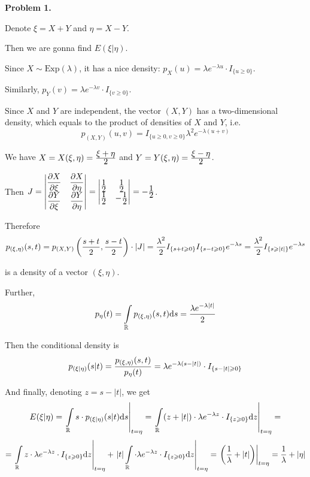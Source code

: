 \documentclass[pdftex,12pt,a4paper]{article}
\begin{document}
\textbf{Problem 1.}\par
Denote $\xi = X + Y$ and $\eta = X - Y$.\par
Then we are gonna find  $E(\xi| \eta)$.\par
Since $X \sim \mathrm{Exp}(\lambda)$, it has a nice density: $p_{X}(u) = \lambda e^{-\lambda u}\cdot I_{\{u \geqslant 0\}}$.\par
Similarly, $p_{Y}(v) =  \lambda e^{-\lambda v}\cdot I_{\{v \geqslant 0\}}$.\par
Since $X$ and $Y$ are independent, the vector $(X,Y)$ has a two-dimensional density, which equals to the product of densities of $X$ and $Y$, i.e.
$$
p_{(X,Y)}(u,v) = I_{\{u\geqslant 0, v\geqslant 0\}}\lambda^{2}e^{-\lambda(u+v)}
$$\par
We have $X = X(\xi, \eta) = \frac{\displaystyle \xi + \eta}{\displaystyle 2}$ and $Y = Y(\xi, \eta) = \frac{\displaystyle \xi - \eta}{\displaystyle 2}$.\par
Then $J = \begin{vmatrix}\dfrac{\displaystyle \partial X}{\displaystyle \partial \xi} & \dfrac{\displaystyle \partial X}{\displaystyle \partial \eta}\\ \dfrac{\displaystyle \partial Y}{\displaystyle \partial \xi}& \dfrac{\displaystyle \partial Y}{\displaystyle \partial \eta}
\end{vmatrix} = \begin{vmatrix}\frac{\displaystyle 1}{\displaystyle 2} & \frac{\displaystyle 1}{\displaystyle 2}\\ \frac{\displaystyle 1}{\displaystyle 2}& -\frac{\displaystyle 1}{\displaystyle 2}
\end{vmatrix} = - \frac{\displaystyle 1}{\displaystyle 2}$.\par
Therefore
$$
p_{(\xi, \eta)}(s,t) = p_{(X,Y)}\left(\frac{\displaystyle s+t}{\displaystyle 2}, \frac{\displaystyle s-t}{\displaystyle 2}\right)\cdot |J| = \frac{\displaystyle \lambda^{2}}{\displaystyle 2}I_{\{ s + t \geqslant 0\}}I_{\{s - t \geqslant 0\}}e^{-\lambda s} = \frac{\displaystyle \lambda^{2}}{\displaystyle 2}I_{\{ s \geqslant |t|\}}e^{-\lambda s}
$$
\par
is a density of a vector $(\xi, \eta)$.\par
Further, 
$$
p_{\eta}(t) = \int\limits_{\mathbb R}p_{(\xi, \eta)}(s,t)\mathrm{d}s = \frac{\displaystyle \lambda e^{-\lambda|t|}}{\displaystyle 2}
$$\par
Then the conditional density is
$$
p_{(\xi | \eta)}(s|t) = \frac{\displaystyle p_{(\xi, \eta)}(s,t)}{\displaystyle p_{\eta}(t)} = \lambda e^{-\lambda(s-|t|)}\cdot I_{\{s - |t|\geqslant 0\}}
$$\par
And finally, denoting $z = s - |t|$, we get
$$
E(\xi|\eta) = \left.\int\limits_{\mathbb R}s\cdot p_{(\xi|\eta)}(s|t)\mathrm{d}s\right|_{t = \eta} = \left.\int\limits_{\mathbb R}(z + |t|)\cdot\lambda e^{-\lambda z}\cdot I_{\{z\geqslant 0\}}\mathrm{d}z\right|_{t = \eta}  = $$  $$= \left.\int\limits_{\mathbb R}z\cdot\lambda e^{-\lambda z}\cdot I_{\{z\geqslant 0\}}\mathrm{d}z\right|_{t = \eta} + \left.|t|\int\limits_{\mathbb R}\cdot\lambda e^{-\lambda z}\cdot I_{\{z\geqslant 0\}}\mathrm{d}z\right|_{t = \eta} =  \left.\left(\frac{\displaystyle 1}{\displaystyle \lambda} + |t|\right)\right|_{t = \eta} = \frac{\displaystyle 1}{\displaystyle \lambda} + |\eta|
$$\par
\end{document}
